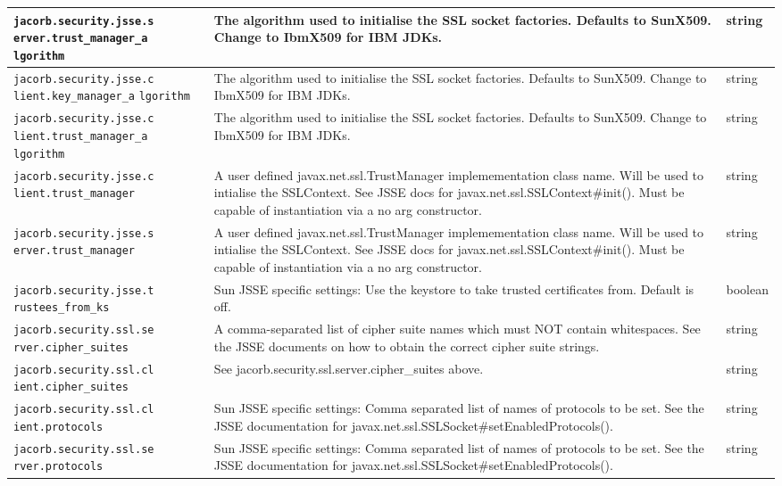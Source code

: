 {{\begin{small}
\begin{longtable}{|p{5cm}|p{9cm}|p{2cm}|}
\hline
\verb"jacorb.security.jsse.s"
\verb"erver.trust_manager_a"
\verb"lgorithm" & The algorithm used to initialise the SSL socket factories. Defaults to SunX509. Change to IbmX509 for IBM JDKs. & string \\
\hline
\verb"jacorb.security.jsse.c"
\verb"lient.key_manager_a"
\verb"lgorithm" & The algorithm used to initialise the SSL socket factories. Defaults to SunX509. Change to IbmX509 for IBM JDKs. & string \\
\hline
\verb"jacorb.security.jsse.c"
\verb"lient.trust_manager_a"
\verb"lgorithm" & The algorithm used to initialise the SSL socket factories. Defaults to SunX509. Change to IbmX509 for IBM JDKs. & string \\
\hline
\verb"jacorb.security.jsse.c"
\verb"lient.trust_manager" & A user defined javax.net.ssl.TrustManager implemementation class name. Will be used to intialise the SSLContext. See JSSE docs for javax.net.ssl.SSLContext\#init(). Must be capable of instantiation via a no arg constructor. & string \\
\hline
\verb"jacorb.security.jsse.s"
\verb"erver.trust_manager" & A user defined javax.net.ssl.TrustManager implemementation class name. Will be used to intialise the SSLContext. See JSSE docs for javax.net.ssl.SSLContext\#init(). Must be capable of instantiation via a no arg constructor. & string \\
\hline
\verb"jacorb.security.jsse.t"
\verb"rustees_from_ks" & Sun JSSE specific settings: Use the keystore to take trusted certificates from. Default is off. & boolean \\
\hline
\verb"jacorb.security.ssl.se"
\verb"rver.cipher_suites" & A comma-separated list of cipher suite names which must NOT contain whitespaces. See the JSSE documents on how to obtain the correct cipher suite strings. & string \\
\hline
\verb"jacorb.security.ssl.cl"
\verb"ient.cipher_suites" & See jacorb.security.ssl.server.cipher\_suites above. & string \\
\hline
\verb"jacorb.security.ssl.cl"
\verb"ient.protocols" & Sun JSSE specific settings: Comma separated list of names of protocols to be set. See the JSSE documentation for javax.net.ssl.SSLSocket\#setEnabledProtocols(). & string \\
\hline
\verb"jacorb.security.ssl.se"
\verb"rver.protocols" & Sun JSSE specific settings: Comma separated list of names of protocols to be set. See the JSSE documentation for javax.net.ssl.SSLSocket\#setEnabledProtocols(). & string \\

\end{longtable}
\end{small}}}
